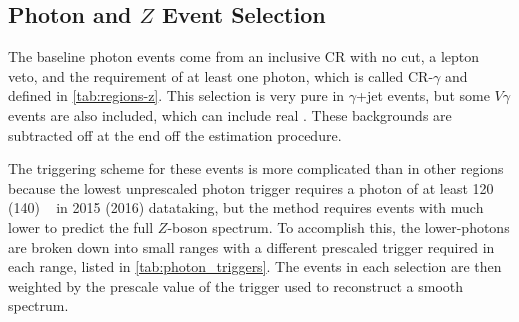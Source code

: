 
\subsection{Photon and $Z$ Event Selection}
\label{sec:photon_eventsel}

The baseline photon events come from an inclusive \ac{CR} with no \met cut, a lepton veto, and the requirement of at least one photon, which is called CR-$\gamma$ and defined in \autoref{tab:regions-z}. This selection is very pure in $\gamma$+jet events, but some $V\gamma$ events are also included, which can include real \met. These backgrounds are subtracted off at the end off the estimation procedure. 

The triggering scheme for these events is more complicated than in other regions because the lowest unprescaled photon trigger requires a photon \pt of at least 120 (140) \gev~ in 2015 (2016) datataking, but the method requires events with much lower \pt to predict the full $Z$-boson \pt spectrum. To accomplish this, the lower-\pt photons are broken down into small \pt ranges with a different prescaled trigger required in each range, listed in \autoref{tab:photon_triggers}. The events in each selection are then weighted by the prescale value of the trigger used to reconstruct a smooth \pt spectrum. 

